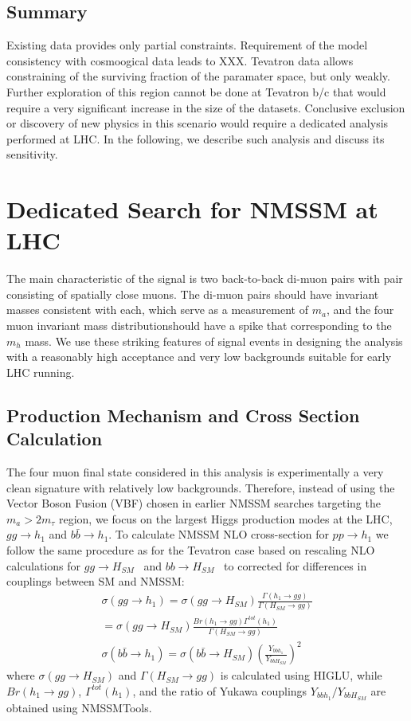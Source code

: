 \documentclass[aps,prl,twocolumn,nofootinbib,superscriptaddress]{revtex4}
\begin{document}
\subsection{Summary}
Existing data provides only partial constraints. Requirement of the model consistency with cosmoogical
data leads to XXX. Tevatron data allows constraining of the surviving fraction of the paramater space, 
but only weakly. Further exploration of this region cannot be done at Tevatron b/c that would require
a very significant increase in the size of the datasets. Conclusive exclusion or discovery of new physics
in this scenario would require a dedicated analysis performed at LHC. In the following, we describe such
analysis and discuss its sensitivity.


\section{Dedicated Search for NMSSM at LHC}

The main characteristic of the signal is two back-to-back di-muon pairs with pair consisting of 
spatially close muons. The di-muon pairs should have invariant masses consistent with each, which
serve as a measurement of $m_a$, and the four muon invariant mass distributionshould have a spike 
that corresponding to the $m_h$ mass. We use these striking features of signal events in designing 
the analysis with a reasonably high acceptance and very low backgrounds suitable for early LHC running.

\subsection{Production Mechanism and Cross Section Calculation}

The four muon final state considered in this analysis is experimentally a very clean signature 
with relatively low backgrounds. Therefore, instead of using the Vector Boson Fusion (VBF)
chosen in earlier NMSSM searches targeting the $m_a>2 m_\tau$ region, we focus on the largest 
Higgs production modes at the LHC, $gg \to h_1$ and $b\bar{b} \to h_1$.  To calculate NMSSM NLO 
cross-section for $pp \to h_1$ we follow the same procedure as for the Tevatron case based on
rescaling NLO calculations for $gg \to H_{SM}$~\cite{Spira:1995rr} and $bb \to H_{SM}$~\cite{Balazs:1998sb} 
to corrected for differences in couplings between SM and NMSSM:
\begin{eqnarray}
\sigma(gg\to h_1)=\sigma(gg\to H_{SM})\frac{\Gamma(h_1\to gg)}{\Gamma(H_{SM}\to gg)} \\
=\sigma(gg\to H_{SM})\frac{Br(h_1\to gg)\Gamma^{tot}(h_1)}{\Gamma(H_{SM}\to gg)} \\
\sigma(b\bar{b}\to h_1)=\sigma(b\bar{b}\to H_{SM})
\left(\frac{Y_{bbh_1}}{Y_{bbH_{SM}}}\right)^2
\end{eqnarray}
where $\sigma(gg\to H_{SM})$ and $\Gamma(H_{SM}\to gg)$ is calculated using
HIGLU, while $Br(h_1\to gg)$, $\Gamma^{tot}(h_1)$, and the ratio of Yukawa couplings 
$Y_{bbh_1}/Y_{bbH_{SM}}$ are obtained using NMSSMTools.
\end{document}
